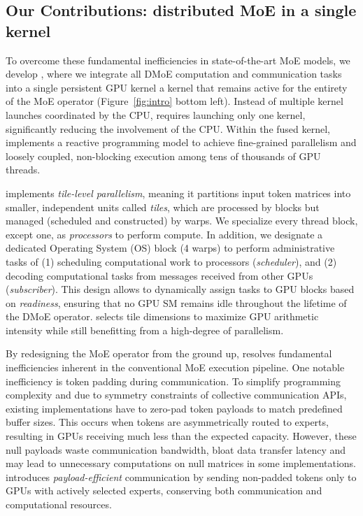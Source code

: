 \subsection{Our Contributions: distributed MoE in a single kernel}
To overcome these fundamental inefficiencies in state-of-the-art MoE models, we develop \sysname, where we integrate all DMoE computation and communication tasks into a single persistent GPU kernel
\ie a kernel that remains active for the entirety of the MoE operator (Figure~\ref{fig:intro} bottom left).
Instead of multiple kernel launches coordinated by the CPU, \sysname requires launching only one kernel,
significantly reducing the involvement of the CPU\@.
Within the fused kernel, \sysname implements a reactive programming model to achieve
fine-grained parallelism and loosely coupled, non-blocking execution among tens of thousands of GPU threads.

\sysname implements \emph{tile-level parallelism},
meaning it partitions input token matrices into smaller, independent units called \emph{tiles},
which are processed by blocks but managed (scheduled and constructed) by warps.
We specialize every thread block, except one, as \emph{processors} to perform compute.
In addition, we designate a dedicated Operating System (OS) block (4 warps) to perform administrative tasks of
(1) scheduling computational work to processors (\emph{scheduler}),
and (2) decoding computational tasks from messages received from other GPUs (\emph{subscriber}).
This design allows \sysname to dynamically assign tasks to GPU blocks based on \emph{readiness},
ensuring that no GPU SM remains idle throughout the lifetime of the DMoE operator.
\sysname selects tile dimensions to maximize GPU arithmetic intensity
while still benefitting from a high-degree of parallelism.

By redesigning the MoE operator from the ground up,
\sysname resolves fundamental inefficiencies inherent in the conventional MoE execution pipeline.
One notable inefficiency is token padding during communication.
To simplify programming complexity and due to symmetry constraints of collective communication APIs,
existing implementations have to zero-pad token payloads to match predefined buffer sizes.
This occurs when tokens are asymmetrically routed to experts, resulting in GPUs receiving much less than the expected
capacity.
However, these null payloads waste communication bandwidth, bloat data transfer latency and may lead to
unnecessary computations on null matrices in some implementations.
\sysname introduces \emph{payload-efficient} communication by sending non-padded tokens only to
GPUs with actively selected experts, conserving both communication and computational resources.

